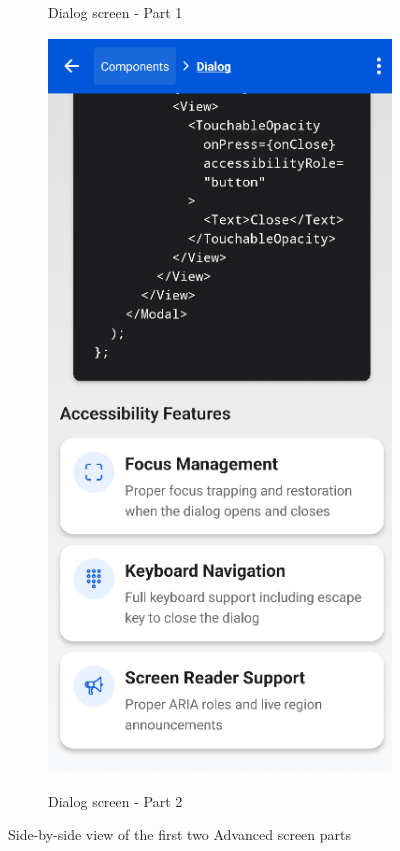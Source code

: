 \begin{figure}[ht]
\begin{subfigure}[b]{0.48\textwidth}
        \caption{Dialog screen - Part 1}
        \label{fig:advanced1-left}
    \end{subfigure}
    \hfill
    \begin{subfigure}[b]{0.48\textwidth}
        \centering
        \includegraphics[width=\linewidth, alt={Second part of the Dialog Screen}]{img/dialog2.png}
        \caption{Dialog screen - Part 2}
        \label{fig:advanced2-right}
    \end{subfigure}
    \caption{Side-by-side view of the first two Advanced screen parts}
    \label{fig:dialog_screens_sidebyside1}
\end{figure}

